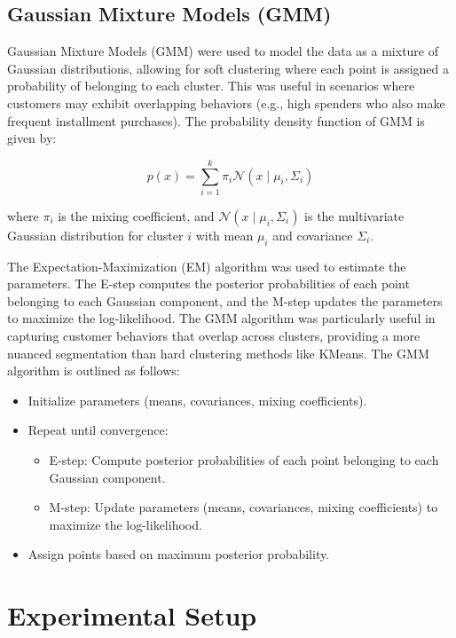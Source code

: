 \documentclass[runningheads,a4paper]{llncs}
\begin{document}
\subsection{Gaussian Mixture Models (GMM)}

Gaussian Mixture Models (GMM) were used to model the data as a mixture of Gaussian distributions, allowing for soft clustering where each point is assigned a probability of belonging to each cluster. This was useful in scenarios where customers may exhibit overlapping behaviors (e.g., high spenders who also make frequent installment purchases). The probability density function of GMM is given by:

\begin{equation}
p(x) = \sum_{i=1}^{k} \pi_i \mathcal{N}(x \mid \mu_i, \Sigma_i)
\end{equation}

where \( \pi_i \) is the mixing coefficient, and \( \mathcal{N}(x \mid \mu_i, \Sigma_i) \) is the multivariate Gaussian distribution for cluster \( i \) with mean \( \mu_i \) and covariance \( \Sigma_i \). 

The Expectation-Maximization (EM) algorithm was used to estimate the parameters. The E-step computes the posterior probabilities of each point belonging to each Gaussian component, and the M-step updates the parameters to maximize the log-likelihood. The GMM algorithm was particularly useful in capturing customer behaviors that overlap across clusters, providing a more nuanced segmentation than hard clustering methods like KMeans. The GMM algorithm is outlined as follows:

\begin{itemize}
    \item Initialize parameters (means, covariances, mixing coefficients).
    \item Repeat until convergence:
    \begin{itemize}
        \item E-step: Compute posterior probabilities of each point belonging to each Gaussian component.
        \item M-step: Update parameters (means, covariances, mixing coefficients) to maximize the log-likelihood.
    \end{itemize}
    \item Assign points based on maximum posterior probability.
\end{itemize}

\section{Experimental Setup}
\end{document}
